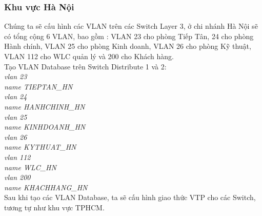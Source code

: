 \documentclass[12pt,a4paper]{report}
\begin{document}
\subsubsection{Khu vực Hà Nội}
\hspace*{1cm}Chúng ta sẽ cấu hình các VLAN trên các Switch Layer 3, ở chi nhánh Hà Nội sẽ có tổng cộng 6 VLAN, bao gồm : VLAN 23 cho phòng Tiếp Tân, 24 cho phòng Hành chính, VLAN 25 cho phòng Kinh doanh, VLAN 26 cho phòng Kỹ thuật, VLAN 112 cho WLC quản lý và 200 cho Khách hàng.\\
\hspace*{1cm}Tạo VLAN Database trên Switch Distribute 1 và 2:\\
\hspace*{2cm}\textit{vlan 23\\
\hspace*{2cm}name TIEPTAN\_HN \\
\hspace*{2cm}vlan 24\\
\hspace*{2cm}name HANHCHINH\_HN\\
\hspace*{2cm}vlan 25\\
\hspace*{2cm}name KINHDOANH\_HN\\
\hspace*{2cm}vlan 26\\
\hspace*{2cm}name KYTHUAT\_HN \\
\hspace*{2cm}vlan 112\\
\hspace*{2cm}name WLC\_HN \\
\hspace*{2cm}vlan 200\\
\hspace*{2cm}name KHACHHANG\_HN\\}
\hspace*{1cm}Sau khi tạo các VLAN Database, ta sẽ cấu hình giao thức VTP cho các Switch, tương tự như khu vực TPHCM.
\end{document}
